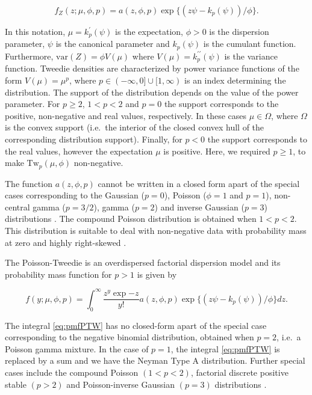 \documentclass[9pt,a5paper,]{book}
\theoremstyle{definition}
\theoremstyle{definition}
\theoremstyle{remark}
\begin{document}
\begin{equation}
f_{Z}(z; \mu, \phi, p) = a(z,\phi,p) \exp\{(z\psi - k_p(\psi))/\phi\}.
\label{eq:tweedie}
\end{equation}

In this notation, \(\mu = k^{\prime}_p(\psi)\) is the expectation,
\(\phi > 0\) is the dispersion parameter, \(\psi\) is the canonical
parameter and \(k_p(\psi)\) is the cumulant function. Furthermore,
\(\mathrm{var}(Z) = \phi V(\mu)\) where
\(V(\mu) = k^{\prime \prime}_p(\psi)\) is the variance function. Tweedie
densities are characterized by power variance functions of the form
\(V(\mu) = \mu^p\), where \(p \in (-\infty ,0] \cup [1,\infty)\) is an
index determining the distribution. The support of the distribution
depends on the value of the power parameter. For \(p \geq 2\),
\(1 < p < 2\) and \(p = 0\) the support corresponds to the positive,
non-negative and real values, respectively. In these cases
\(\mu \in \Omega\), where \(\Omega\) is the convex support (i.e.~the
interior of the closed convex hull of the corresponding distribution
support). Finally, for \(p < 0\) the support corresponds to the real
values, however the expectation \(\mu\) is positive. Here, we required
\(p \geq 1\), to make \(\mathrm{Tw}_p(\mu, \phi)\) non-negative.

The function \(a(z,\phi, p)\) cannot be written in a closed form apart
of the special cases corresponding to the Gaussian (\(p = 0\)), Poisson
(\(\phi = 1\) and \(p = 1\)), non-central gamma (\(p = 3/2\)), gamma
(\(p = 2\)) and inverse Gaussian (\(p = 3\)) distributions
\citep{Jorgensen1997}. The compound Poisson distribution is obtained
when \(1 < p < 2\). This distribution is suitable to deal with
non-negative data with probability mass at zero and highly right-skewed
\citep{Andersen2016}.

The Poisson-Tweedie is an overdispersed factorial dispersion model
\citep{Jorgensen2014} and its probability mass function for \(p > 1\) is
given by

\begin{equation}
f(y;\mu,\phi,p) = \int_0^\infty \frac{z^y \exp{-z}}{y!} a(z,\phi,p) \exp\{(z\psi - k_p(\psi))/\phi\} dz.
\label{eq:pmfPTW}
\end{equation}

The integral \eqref{eq:pmfPTW} has no closed-form apart of the special
case corresponding to the negative binomial distribution, obtained when
\(p = 2\), i.e.~a Poisson gamma mixture. In the case of \(p=1\), the
integral \eqref{eq:pmfPTW} is replaced by a sum and we have the Neyman
Type A distribution. Further special cases include the compound Poisson
\((1 < p < 2)\), factorial discrete positive stable \((p > 2)\) and
Poisson-inverse Gaussian \((p = 3)\) distributions \citetext{\citealp[
]{Jorgensen2014}; \citealp{Kokonendji2004}}.
\end{document}
